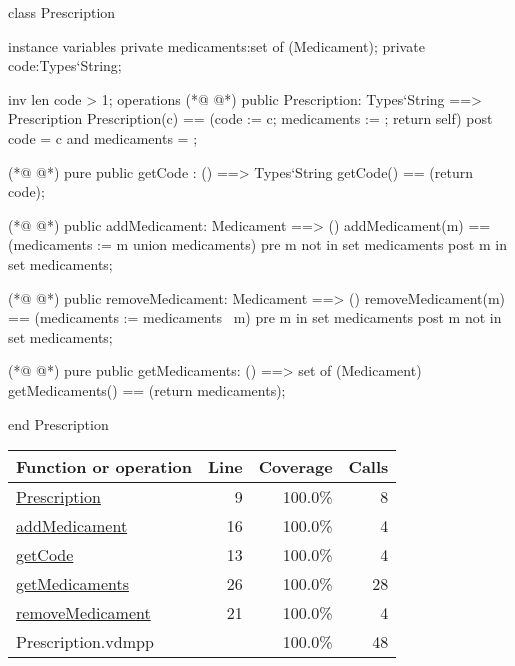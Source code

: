 \begin{vdmpp}[breaklines=true]
class Prescription

instance variables
  private medicaments:set of (Medicament);
  private code:Types`String;
  
  inv len code > 1;
operations
(*@
\label{Prescription:9}
@*)
 public Prescription: Types`String ==> Prescription
  Prescription(c) == (code := c; medicaments := {}; return self)
 post code = c and medicaments = {};
 
(*@
\label{getCode:13}
@*)
 pure public getCode : () ==> Types`String
  getCode() == (return code);
  
(*@
\label{addMedicament:16}
@*)
 public addMedicament: Medicament ==> ()
  addMedicament(m) == (medicaments := {m} union medicaments)
 pre m not in set medicaments
 post m in set medicaments;
  
(*@
\label{removeMedicament:21}
@*)
 public removeMedicament: Medicament ==> ()
  removeMedicament(m) == (medicaments := medicaments \ {m})
 pre m in set medicaments
 post m not in set medicaments;
  
(*@
\label{getMedicaments:26}
@*)
 pure public getMedicaments: () ==> set of (Medicament)
  getMedicaments() == (return medicaments);

end Prescription
\end{vdmpp}
\bigskip
\begin{longtable}{|l|r|r|r|}
\hline
Function or operation & Line & Coverage & Calls \\
\hline
\hline
\hyperref[Prescription:9]{Prescription} & 9&100.0\% & 8 \\
\hline
\hyperref[addMedicament:16]{addMedicament} & 16&100.0\% & 4 \\
\hline
\hyperref[getCode:13]{getCode} & 13&100.0\% & 4 \\
\hline
\hyperref[getMedicaments:26]{getMedicaments} & 26&100.0\% & 28 \\
\hline
\hyperref[removeMedicament:21]{removeMedicament} & 21&100.0\% & 4 \\
\hline
\hline
Prescription.vdmpp & & 100.0\% & 48 \\
\hline
\end{longtable}

